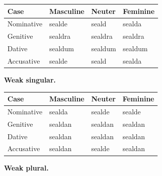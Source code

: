 \par\begingroup
\fontsize{10.5}{13.2}\selectfont
\setlength{\LTleft}{0pt}\setlength{\LTright}{\fill}
\noindent
\begin{tabular}{@{}>{\raggedright\arraybackslash}p{22.0mm}>{\raggedright\arraybackslash}p{31.188mm}>{\raggedright\arraybackslash}p{31.188mm}>{\raggedright\arraybackslash}p{31.188mm}@{}}
\toprule
\textbf{Case} & \textbf{Masculine} & \textbf{Neuter} & \textbf{Feminine} \\
\midrule
Nominative & sealde & seald & sealda \\
Genitive & sealdra & sealdra & sealdra \\
Dative & sealdum & sealdum & sealdum \\
Accusative & sealde & seald & sealda \\
\bottomrule
\end{tabular}
\par\endgroup
\textbf{Weak singular.}

\par\begingroup
\fontsize{10.5}{13.2}\selectfont
\setlength{\LTleft}{0pt}\setlength{\LTright}{\fill}
\noindent
\begin{tabular}{@{}>{\raggedright\arraybackslash}p{22.0mm}>{\raggedright\arraybackslash}p{31.188mm}>{\raggedright\arraybackslash}p{31.188mm}>{\raggedright\arraybackslash}p{31.188mm}@{}}
\toprule
\textbf{Case} & \textbf{Masculine} & \textbf{Neuter} & \textbf{Feminine} \\
\midrule
Nominative & sealda & sealde & sealde \\
Genitive & sealdan & sealdan & sealdan \\
Dative & sealdan & sealdan & sealdan \\
Accusative & sealdan & sealde & sealdan \\
\bottomrule
\end{tabular}
\par\endgroup
\textbf{Weak plural.}

